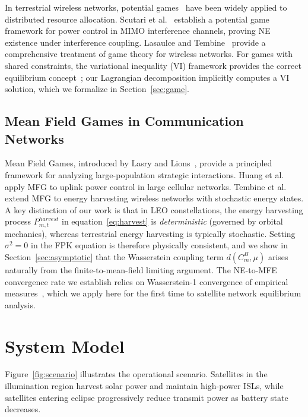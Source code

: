\documentclass[journal]{IEEEtran}
\newcommand{\CB}{C^{B}}
\begin{document}
In terrestrial wireless networks, potential games~\cite{monderer1996potential} have been widely applied to distributed resource allocation. Scutari et al.~\cite{scutari2008mimo} establish a potential game framework for power control in MIMO interference channels, proving NE existence under interference coupling. Lasaulce and Tembine~\cite{lasaulce2011gametheory} provide a comprehensive treatment of game theory for wireless networks. For games with shared constraints, the variational inequality (VI) framework provides the correct equilibrium concept~\cite{facchinei2007vi}; our Lagrangian decomposition implicitly computes a VI solution, which we formalize in Section~\ref{sec:game}.

\subsection{Mean Field Games in Communication Networks}

Mean Field Games, introduced by Lasry and Lions~\cite{lasry2007mfg}, provide a principled framework for analyzing large-population strategic interactions. Huang et al.~\cite{huang2012socialoptima} apply MFG to uplink power control in large cellular networks. Tembine et al.~\cite{tembine2014risksensitive} extend MFG to energy harvesting wireless networks with stochastic energy states. A key distinction of our work is that in LEO constellations, the energy harvesting process $P_{m,t}^{harvest}$ in equation~\eqref{eq:harvest} is \emph{deterministic} (governed by orbital mechanics), whereas terrestrial energy harvesting is typically stochastic. Setting $\sigma^2=0$ in the FPK equation is therefore physically consistent, and we show in Section~\ref{sec:asymptotic} that the Wasserstein coupling term $d(\CB_m,\mu)$ arises naturally from the finite-to-mean-field limiting argument. The NE-to-MFE convergence rate we establish relies on Wasserstein-1 convergence of empirical measures~\cite{fournier2015wasserstein}, which we apply here for the first time to satellite network equilibrium analysis.

\section{System Model}
\label{sec:model}

Figure~\ref{fig:scenario} illustrates the operational scenario. Satellites in the illumination region harvest solar power and maintain high-power ISLs, while satellites entering eclipse progressively reduce transmit power as battery state decreases.
\end{document}
